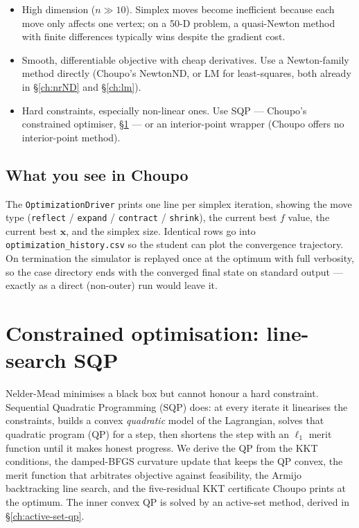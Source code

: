 \documentclass[11pt,a4paper]{article}
\newcommand{\xv}{\mathbf{x}}
\begin{document}
\begin{itemize}
    \item High dimension ($n \gg 10$).  Simplex moves become inefficient
          because each move only affects one vertex; on a 50-D problem,
          a quasi-Newton method with finite differences typically wins
          despite the gradient cost.
    \item Smooth, differentiable objective with cheap derivatives.  Use
          a Newton-family method directly (Choupo's NewtonND, or LM
          for least-squares, both already in §\ref{ch:nrND} and
          §\ref{ch:lm}).
    \item Hard constraints, especially non-linear ones.  Use SQP ---
          Choupo's constrained optimiser, §\ref{ch:sqp} --- or an
          interior-point wrapper (Choupo offers no interior-point method).
\end{itemize}

\subsection*{What you see in Choupo}

The \texttt{OptimizationDriver} prints one line per simplex iteration,
showing the move type (\texttt{reflect} / \texttt{expand} /
\texttt{contract} / \texttt{shrink}), the current best $f$ value, the
current best $\xv$, and the simplex size.  Identical rows go into
\texttt{optimization\_history.csv} so the student can plot the
convergence trajectory.  On termination the simulator is replayed once
at the optimum with full verbosity, so the case directory ends with
the converged final state on standard output --- exactly as a direct
(non-outer) run would leave it.

\section{Constrained optimisation: line-search SQP}\label{ch:sqp}

\begin{whatyoulllearn}
Nelder-Mead minimises a black box but cannot honour a hard constraint.
Sequential Quadratic Programming (SQP) does: at every iterate it
linearises the constraints, builds a convex \emph{quadratic} model of
the Lagrangian, solves that quadratic program (QP) for a step, then
shortens the step with an $\ell_1$ merit function until it makes
honest progress. We derive the QP from the KKT conditions, the
damped-BFGS curvature update that keeps the QP convex, the merit
function that arbitrates objective against feasibility, the Armijo
backtracking line search, and the five-residual KKT certificate
Choupo prints at the optimum. The inner convex QP is solved by an
active-set method, derived in §\ref{ch:active-set-qp}.
\end{whatyoulllearn}
\end{document}
